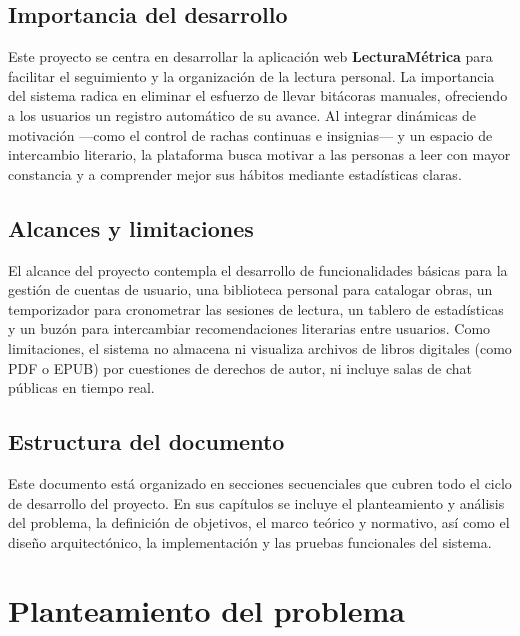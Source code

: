\documentclass[12pt, atypical, journal]{article}
\begin{document}
\subsection{Importancia del desarrollo}
Este proyecto se centra en desarrollar la aplicación web \textbf{LecturaMétrica} para facilitar el seguimiento y la organización de la lectura personal. La importancia del sistema radica en eliminar el esfuerzo de llevar bitácoras manuales, ofreciendo a los usuarios un registro automático de su avance. Al integrar dinámicas de motivación —como el control de rachas continuas e insignias— y un espacio de intercambio literario, la plataforma busca motivar a las personas a leer con mayor constancia y a comprender mejor sus hábitos mediante estadísticas claras.

\subsection{Alcances y limitaciones}
El alcance del proyecto contempla el desarrollo de funcionalidades básicas para la gestión de cuentas de usuario, una biblioteca personal para catalogar obras, un temporizador para cronometrar las sesiones de lectura, un tablero de estadísticas y un buzón para intercambiar recomendaciones literarias entre usuarios. Como limitaciones, el sistema no almacena ni visualiza archivos de libros digitales (como PDF o EPUB) por cuestiones de derechos de autor, ni incluye salas de chat públicas en tiempo real.

\subsection{Estructura del documento}
Este documento está organizado en secciones secuenciales que cubren todo el ciclo de desarrollo del proyecto. En sus capítulos se incluye el planteamiento y análisis del problema, la definición de objetivos, el marco teórico y normativo, así como el diseño arquitectónico, la implementación y las pruebas funcionales del sistema.

\newpage

\section{Planteamiento del problema}
\end{document}
